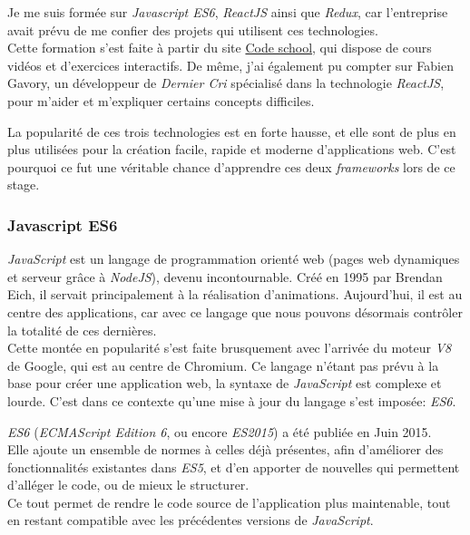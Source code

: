 \documentclass[12pt,a4paper]{article}
\begin{document}
  Je me suis formée sur \emph{Javascript ES6}, \emph{ReactJS} ainsi que
  \emph{Redux}, car l'entreprise avait prévu de me confier des projets qui
  utilisent ces technologies.\\
  Cette formation s'est faite à partir du site
  \href{https://www.codeschool.com/}{Code school}, qui dispose de cours
  vidéos et d'exercices interactifs. De même, j'ai également pu compter
  sur Fabien Gavory, un développeur de \emph{Dernier Cri} spécialisé dans
  la technologie \emph{ReactJS}, pour m'aider et m'expliquer certains
  concepts difficiles.

  \bigskip

  La popularité de ces trois technologies est en forte hausse, et elle
  sont de plus en plus utilisées pour la création facile, rapide et
  moderne d'applications web. C'est pourquoi ce fut une véritable chance
  d'apprendre ces deux \emph{frameworks} lors de ce stage.

  \bigskip

  \subsubsection{Javascript ES6}\label{javascript-es6}

  \bigskip

  \emph{JavaScript} est un langage de programmation orienté web (pages web
  dynamiques et serveur grâce à \emph{NodeJS}), devenu incontournable.
  Créé en 1995 par Brendan Eich, il servait principalement à la
  réalisation d'animations. Aujourd'hui, il est au centre des
  applications, car avec ce langage que nous pouvons désormais contrôler
  la totalité de ces dernières.\\
  Cette montée en popularité s'est faite brusquement avec l'arrivée du
  moteur \emph{V8} de Google, qui est au centre de Chromium. Ce langage
  n'étant pas prévu à la base pour créer une application web, la syntaxe
  de \emph{JavaScript} est complexe et lourde. C'est dans ce contexte
  qu'une mise à jour du langage s'est imposée: \emph{ES6}.

  \bigskip

  \emph{ES6} (\emph{ECMAScript Edition 6}, ou encore \emph{ES2015}) a été
  publiée en Juin 2015.\\
  Elle ajoute un ensemble de normes à celles déjà présentes, afin
  d'améliorer des fonctionnalités existantes dans \emph{ES5}, et d'en
  apporter de nouvelles qui permettent d'alléger le code, ou de mieux le
  structurer.\\
  Ce tout permet de rendre le code source de l'application plus
  maintenable, tout en restant compatible avec les précédentes versions de
  \emph{JavaScript}.
\end{document}
